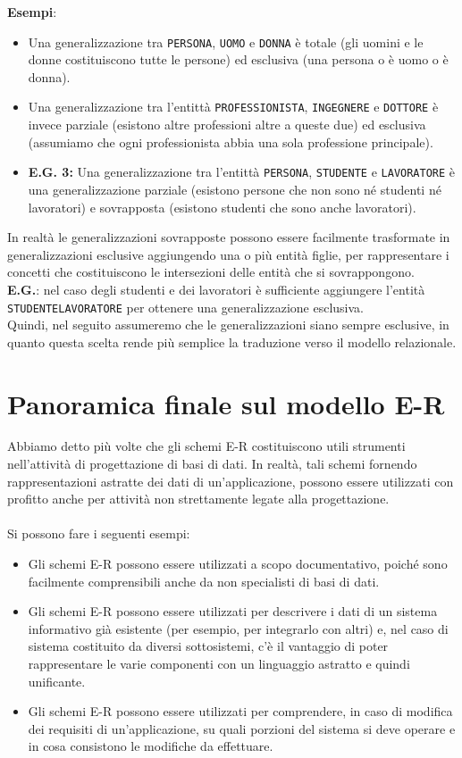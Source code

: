 \textbf{Esempi}:
    \begin{itemize}
        \item{Una generalizzazione tra \texttt{PERSONA}, \texttt{UOMO} e \texttt{DONNA} è totale (gli uomini e le donne costituiscono tutte le persone) ed esclusiva (una persona o è uomo o è donna).}
        \item{Una generalizzazione tra l'entittà \texttt{PROFESSIONISTA}, \texttt{INGEGNERE} e \texttt{DOTTORE} è invece parziale (esistono altre professioni altre a queste due) ed esclusiva (assumiamo che ogni professionista abbia una sola professione principale).}
        \item{\textbf{E.G. 3:} Una generalizzazione tra l'entittà \texttt{PERSONA}, \texttt{STUDENTE} e \texttt{LAVORATORE} è una generalizzazione parziale (esistono persone che non sono né studenti né lavoratori) e sovrapposta (esistono studenti che sono anche lavoratori).}
    \end{itemize}
In realtà le generalizzazioni sovrapposte possono essere facilmente trasformate in generalizzazioni esclusive aggiungendo una o più entità figlie, per rappresentare i concetti che costituiscono le intersezioni delle entità che si sovrappongono.\\
\textbf{E.G.}: nel caso degli studenti e dei lavoratori è sufficiente aggiungere l'entità \texttt{STUDENTELAVORATORE} per ottenere una generalizzazione esclusiva.\\
Quindi, nel seguito assumeremo che le generalizzazioni siano sempre esclusive, in quanto questa scelta rende più semplice la traduzione verso il modello relazionale.



\section{Panoramica finale sul modello E-R}
Abbiamo detto più volte che gli schemi E-R costituiscono utili strumenti nell'attività di progettazione di basi di dati. In realtà, tali schemi fornendo rappresentazioni astratte dei dati di un'applicazione, possono essere utilizzati con profitto anche per attività non strettamente legate alla progettazione.\\\\
Si possono fare i seguenti esempi:
    \begin{itemize}
        \item{Gli schemi E-R possono essere utilizzati a scopo documentativo, poiché sono facilmente comprensibili anche da non specialisti di basi di dati.}
        \item{Gli schemi E-R possono essere utilizzati per descrivere i dati di un sistema informativo già esistente (per esempio, per integrarlo con altri) e, nel caso di sistema costituito da diversi sottosistemi, c'è il vantaggio di poter rappresentare le varie componenti con un linguaggio astratto e quindi unificante.}
        \item{Gli schemi E-R possono essere utilizzati per comprendere, in caso di modifica dei requisiti di un'applicazione, su quali porzioni del sistema si deve operare e in cosa consistono le modifiche da effettuare.}
    \end{itemize}




